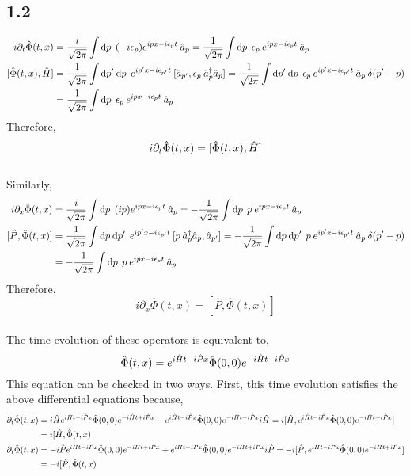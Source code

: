 \documentclass[12pt]{extarticle}
\newcommand{\field}{\hat{\Phi}}
\begin{document}
\subsection*{1.2}
\begin{align*}
i \partial_t \field(t, x) & = \frac{i}{\sqrt{2 \pi}} \int \d{p} \: (- i \epsilon_p) e^{i px - i \epsilon_p t} \: \a_p  = \frac{1}{\sqrt{2 \pi}} \int \d{p} \: \epsilon_p \: e^{i px - i \epsilon_p t} \: \a_p 
\\
[\field(t, x), \hamilt] & = \frac{1}{\sqrt{2 \pi}} \int \d{p'} \d{p} \: e^{i p' x - i \epsilon_{p'} t} \: [\a_{p'},  \epsilon_p \: \adag_p \a_p] = \frac{1}{\sqrt{2 \pi}} \int \d{p'} \d{p} \:  \epsilon_p \: e^{i p' x - i \epsilon_{p'} t} \: \a_p \: \delta(p' - p)
\\
& = \frac{1}{\sqrt{2 \pi}} \int \d{p} \: \epsilon_p \: e^{i p x - i \epsilon_p t} \: \a_p 
\end{align*}
Therefore,
\[ i \partial_t \field(t, x) = [\field(t, x), \hamilt] \] \bigskip \\
Similarly,
\begin{align*}
i \partial_x \field(t, x) & = \frac{i}{\sqrt{2 \pi}} \int \d{p} \: (i p) e^{i px - i \epsilon_p t} \: \a_p  = - \frac{1}{\sqrt{2 \pi}} \int \d{p} \: p \: e^{i px - i \epsilon_p t} \: \a_p 
\\
[\hat{P}, \field(t, x)] & = \frac{1}{\sqrt{2 \pi}} \int \d{p} \d{p'} \: e^{i p' x - i \epsilon_{p'} t} \: [p \: \adag_p \a_p, \a_{p'}] = - \frac{1}{\sqrt{2 \pi}} \int \d{p} \d{p'} \: p \: e^{i p' x - i \epsilon_{p'} t} \: \a_p \: \delta(p' - p)
\\
& = - \frac{1}{\sqrt{2 \pi}} \int \d{p} \: p \: e^{i p x - i \epsilon_p t} \: \a_p 
\end{align*}
Therefore,
\[ i \partial_x \field(t, x) = [\hat{P}, \field(t, x)] \] \bigskip \\
The time evolution of these operators is equivalent to,
\[ \field(t, x) = e^{i \hamilt t - i \hat{P} x} \field(0, 0) e^{- i \hamilt t + i \hat{P} x} \] 
This equation can be checked in two ways. First, this time evolution satisfies the above differential equations because,
\begin{align*}
\partial_t \field(t, x) & = i \hamilt e^{i \hamilt t - i \hat{P} x} \field(0, 0) e^{- i \hamilt t + i \hat{P} x} - e^{i \hamilt t - i \hat{P} x} \field(0, 0) e^{- i \hamilt t + i \hat{P} x} i \hamilt = i [\hamilt, e^{i \hamilt t - i \hat{P} x} \field(0, 0) e^{- i \hamilt t + i \hat{P} x}] 
\\
& = i [\hamilt, \field(t, x)
\\
\partial_t \field(t, x) & = -i \hat{P} e^{i \hamilt t - i \hat{P} x} \field(0, 0) e^{- i \hamilt t + i \hat{P} x} + e^{i \hamilt t - i \hat{P} x} \field(0, 0) e^{- i \hamilt t + i \hat{P} x} i \hat{P} = - i [\hat{P}, e^{i \hamilt t - i \hat{P} x} \field(0, 0) e^{- i \hamilt t + i \hat{P} x}] 
\\
& = - i [\hat{P}, \field(t, x)
\end{align*}
\end{document}
